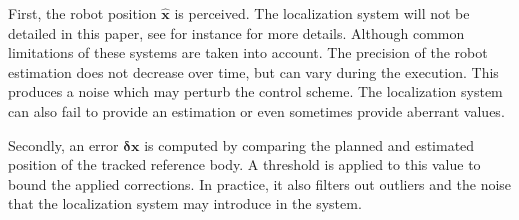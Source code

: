 First, the robot position $\hat{\mathbf{x}}$ is perceived. The
localization system will not be detailed in this paper, see
\cite{08ijhr.stasse, 06humanoids.thompson} for instance for more
details. Although common limitations of these systems are taken into
account. The precision of the robot estimation does not decrease over
time, but can vary during the execution. This produces a noise which
may perturb the control scheme. The localization system can also fail
to provide an estimation or even sometimes provide aberrant values.

Secondly, an error $\mathbf{\delta \mathbf{x}}$ is computed by
comparing the planned and estimated position of the tracked reference
body. A threshold is applied to this value to bound the applied
corrections. In practice, it also filters out outliers and the noise
that the localization system may introduce in the system.


